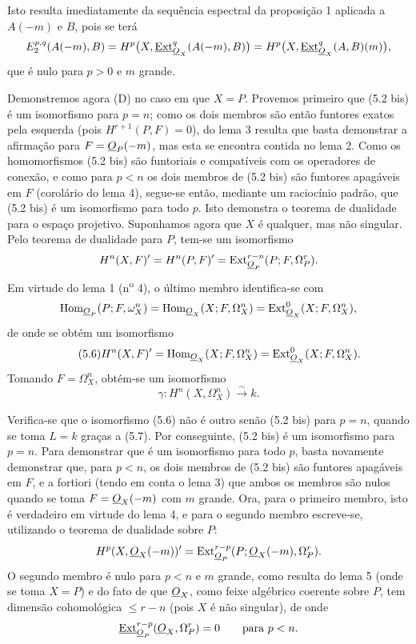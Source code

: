 Isto resulta imediatamente da sequência espectral da proposição 1 aplicada a
$A(-m)$ e $B$, pois se terá
\[
  E_{2}^{p,q}(A(-m),B)
  =H^{p}\bigl(X,\underline{\operatorname{Ext}}_{\underline{O}_X}^{q}(A(-m),B)\bigr)
  =H^{p}\bigl(X,\underline{\operatorname{Ext}}_{\underline{O}_X}^{q}(A,B)(m)\bigr),
\]
que é nulo para $p>0$ e $m$ grande.

Demonstremos agora (D) no caso em que $X=P$. Provemos primeiro que (5.2 bis)
é um isomorfismo para $p=n$; como os dois membros são então
funtores exatos pela esquerda (pois $H^{r+1}(P,F)=0$), do lema 3 resulta
que basta demonstrar a afirmação para $F=\underline{O}_P(-m)$, mas esta se encontra
contida no lema 2. Como os homomorfismos (5.2 bis) são funtoriais e
compatíveis com os operadores de conexão, e como para $p<n$ os dois membros de
(5.2 bis) são funtores apagáveis em $F$ (corolário do lema 4), segue-se
então, mediante um raciocínio padrão, que (5.2 bis) é um isomorfismo
para todo $p$. Isto demonstra o teorema de dualidade para o espaço projetivo.
Suponhamos agora que $X$ é qualquer, mas não singular. Pelo teorema de
dualidade para $P$, tem-se um isomorfismo
\[
  H^{n}(X,F)'=H^{n}(P,F)'
  =\operatorname{Ext}_{\underline{O}_P}^{r-n}(P;F,\Omega_P^{r}).
\]
Em virtude do lema 1 (n\textsuperscript{o} 4), o último membro identifica-se com
\[
  \operatorname{Hom}_{\underline{O}_P}(P;F,\omega_X^{n})
  =\operatorname{Hom}_{\underline{O}_X}(X;F,\Omega_X^{n})
  =\operatorname{Ext}_{\underline{O}_X}^{0}(X;F,\Omega_X^{n}),
\]
de onde se obtém um isomorfismo
\begin{equation}\tag{5.6}
  H^{n}(X,F)'=\operatorname{Hom}_{\underline{O}_X}(X;F,\Omega_X^{n})
  =\operatorname{Ext}_{\underline{O}_X}^{0}(X;F,\Omega_X^{n}).
\end{equation}
Tomando $F=\Omega_X^{n}$, obtém-se um isomorfismo
\begin{equation}\tag{5.7}
  \gamma:H^{n}(X,\Omega_X^{n})\xrightarrow{\sim}k.
\end{equation}

Verifica-se que o isomorfismo (5.6) não é outro senão (5.2 bis) para $p=n$, quando
se toma $L=k$ graças a (5.7). Por conseguinte, (5.2 bis) é um isomorfismo para
$p=n$. Para demonstrar que é um isomorfismo para todo $p$, basta novamente
demonstrar que, para $p<n$, os dois membros de (5.2 bis) são funtores
apagáveis em $F$, e a fortiori (tendo em conta o lema 3) que ambos os membros
são nulos quando se toma $F=\underline{O}_X(-m)$ com $m$ grande. Ora, para o primeiro
membro, isto é verdadeiro em virtude do lema 4, e para o segundo membro escreve-se,
utilizando o teorema de dualidade sobre $P$:
\[
  H^{p}(X,\underline{O}_X(-m))'
  =\operatorname{Ext}_{\underline{O}_P}^{r-p}
    (P;\underline{O}_X(-m),\Omega_P^{r}).
\]
O segundo membro é nulo para $p<n$ e $m$ grande, como resulta do lema 5
(onde se toma $X=P$) e do fato de que $\underline{O}_X$, como feixe algébrico
coerente sobre $P$, tem dimensão cohomológica $\leq r-n$ (pois $X$ é não
singular), de onde
\[
  \underline{\operatorname{Ext}}_{\underline{O}_P}^{r-p}(\underline{O}_X,\Omega_P^{r})=0
  \qquad\text{para }p<n.
\]

